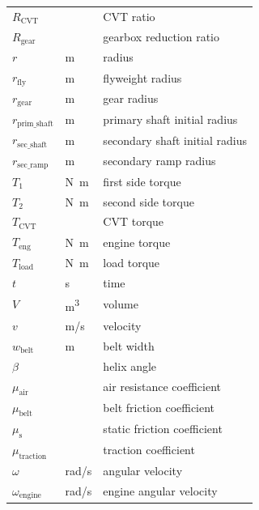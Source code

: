 \documentclass[12pt]{article}
\begin{document}
\begin{longtable*}{l l p{12cm}}
$R_{\text{CVT}}$ & \si[per-mode=symbol] {} & CVT ratio \\
$R_{\text{gear}}$ & \si[per-mode=symbol] {} & gearbox reduction ratio \\
$r$ & \si[per-mode=symbol] {\metre} & radius \\
$r_{\text{fly}}$ & \si[per-mode=symbol] {\metre} & flyweight radius \\
$r_{\text{gear}}$ & \si[per-mode=symbol] {\metre} & gear radius \\
$r_{\text{prim\_shaft}}$ & \si[per-mode=symbol] {\metre} & primary shaft initial radius \\
$r_{\text{sec\_shaft}}$ & \si[per-mode=symbol] {\metre} & secondary shaft initial radius \\
$r_{\text{sec\_ramp}}$ & \si[per-mode=symbol] {\metre} & secondary ramp radius \\
$T_1$ & \si[per-mode=symbol] {\newton\metre} & first side torque \\
$T_2$ & \si[per-mode=symbol] {\newton\metre} & second side torque \\
$T_{\text{CVT}}$ & \si[per-mode=symbol] {} & CVT torque \\
$T_{\text{eng}}$ & \si[per-mode=symbol] {\newton\metre} & engine torque \\
$T_{\text{load}}$ & \si[per-mode=symbol] {\newton\metre} & load torque \\
$t$ & \si[per-mode=symbol] {\second} & time \\
$V$ & \si[per-mode=symbol] {\metre\cubed} & volume \\
$v$ & \si[per-mode=symbol] {\metre\per\second} & velocity \\
$w_{\text{belt}}$ & \si[per-mode=symbol] {\metre} & belt width \\
$\beta$ & \si[per-mode=symbol] {} & helix angle \\
$\mu_{\text{air}}$ & \si[per-mode=symbol] {} & air resistance coefficient \\
$\mu_{\text{belt}}$ & \si[per-mode=symbol] {} & belt friction coefficient \\
$\mu_{\text{s}}$ & \si[per-mode=symbol] {} & static friction coefficient \\
$\mu_{\text{traction}}$ & \si[per-mode=symbol] {} & traction coefficient \\
$\omega$ & \si[per-mode=symbol] {\radian\per\second} & angular velocity \\
$\omega_{\text{engine}}$ & \si[per-mode=symbol] {\radian\per\second} & engine angular velocity \\

\end{longtable*}
\end{document}
